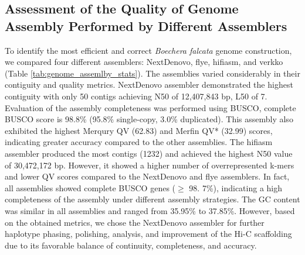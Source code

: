 \documentclass[9pt,twocolumn,twoside,lineno]{gsag3jnl}
\begin{document}
\subsection{Assessment of the Quality of Genome Assembly Performed by Different Assemblers}

To identify the most efficient and correct \textit{Boechera falcata} genome construction, we compared four different assemblers: NextDenovo, flye, hifiasm, and verkko (Table \ref{tab:genome_assemlby_stats}). The assemblies varied considerably in their contiguity and quality metrics. NextDenovo assembler demonstrated the highest contiguity with only 50 contigs achieving N50 of 12,407,843 bp, L50 of 7. Evaluation of the assembly completeness was performed using BUSCO, complete BUSCO score is 98.8\% (95.8\% single-copy, 3.0\% duplicated). This assembly also exhibited the highest Merqury QV (62.83) and Merfin QV* (32.99) scores, indicating greater accuracy compared to the other assemblies.
The hifiasm assembler produced the most contigs (1232) and achieved the highest N50 value of 30,472,172 bp. However, it showed a higher number of overrepresented k-mers and lower QV scores compared to the NextDenovo and flye assemblers.
In fact, all assemblies showed complete BUSCO genes ($\geq$ 98. 7\%), indicating a high completeness of the assembly under different assembly strategies. The GC content was similar in all assemblies and ranged from 35.95\% to 37.85\%. However, based on the obtained metrics, we chose the NextDenovo assembler for further haplotype phasing, polishing, analysis, and improvement of the Hi-C scaffolding due to its favorable balance of continuity, completeness, and accuracy.
\end{document}
